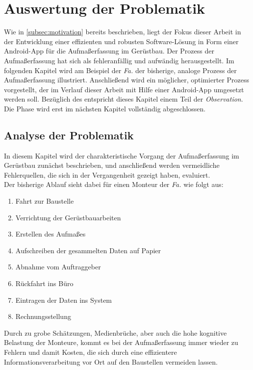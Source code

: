 \chapter{Auswertung der Problematik}\label{chap:problem}
Wie in \autoref{subsec:motivation} bereits beschrieben, liegt der Fokus dieser Arbeit in der Entwicklung einer effizienten und robusten Software-Lösung in Form einer Android-App für die Aufmaßerfassung im Gerüstbau.
Der Prozess der Aufmaßerfassung hat sich als fehleranfällig und aufwändig herausgestellt.
Im folgenden Kapitel wird am Beispiel der \emph{Fa.} \vr{} der bisherige, analoge Prozess der Aufmaßerfassung illustriert.
Anschließend wird ein möglicher, optimierter Prozess vorgestellt, der im Verlauf dieser Arbeit mit Hilfe einer Android-App umgesetzt werden soll.
Bezüglich des \hcdp{} entspricht dieses Kapitel einem Teil der \emph{Observation}.
Die Phase wird erst im nächsten Kapitel vollständig abgeschlossen.

\section{Analyse der Problematik}\label{sec:problem}
In diesem Kapitel wird der charakteristische Vorgang der Aufmaßerfassung im Gerüstbau zunächst beschrieben, und anschließend werden vermeidliche Fehlerquellen, die sich in der Vergangenheit gezeigt haben, evaluiert. \\

\noindent
Der bisherige Ablauf sieht dabei für einen Monteur der \emph{Fa.} \vr{} wie folgt aus:
\begin{enumerate}
  \item Fahrt zur Baustelle
  \item Verrichtung der Gerüstbauarbeiten
  \item Erstellen des Aufmaßes
  \item Aufschreiben der gesammelten Daten auf Papier \label{itm:paper}
  \item Abnahme vom Auftraggeber
  \item Rückfahrt ins Büro
  \item Eintragen der Daten ins System \label{itm:system}
  \item Rechnungsstellung
\end{enumerate}

\noindent
Durch zu grobe Schätzungen, Medienbrüche, aber auch die hohe kognitive Belastung der Monteure, kommt es bei der Aufmaßerfassung immer wieder zu Fehlern und damit Kosten, die sich durch eine effizientere Informationsverarbeitung vor Ort auf den Baustellen vermeiden lassen. \\

